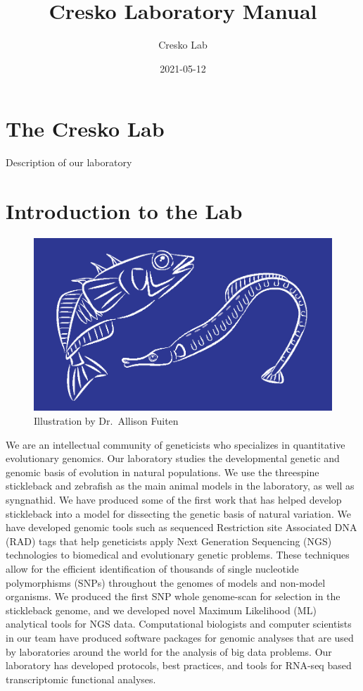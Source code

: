\documentclass[
]{book}
\title{Cresko Laboratory Manual}
\author{Cresko Lab}
\date{2021-05-12}
\begin{document}
\maketitle

{
\setcounter{tocdepth}{1}
\tableofcontents
}
\hypertarget{the-cresko-lab}{%
\chapter{The Cresko Lab}\label{the-cresko-lab}}

Description of our laboratory

\hypertarget{introduction-to-the-lab}{%
\chapter{Introduction to the Lab}\label{introduction-to-the-lab}}

\begin{figure}
\centering
\includegraphics{images/Lab_logo.png}
\caption{Illustration by Dr.~Allison Fuiten}
\end{figure}

We are an intellectual community of geneticists who specializes in quantitative evolutionary genomics. Our laboratory studies the developmental genetic and genomic basis of evolution in natural populations. We use the threespine stickleback and zebrafish as the main animal models in the laboratory, as well as syngnathid. We have produced some of the first work that has helped develop stickleback into a model for dissecting the genetic basis of natural variation. We have developed genomic tools such as sequenced Restriction site Associated DNA (RAD) tags that help geneticists apply Next Generation Sequencing (NGS) technologies to biomedical and evolutionary genetic problems. These techniques allow for the efficient identification of thousands of single nucleotide polymorphisms (SNPs) throughout the genomes of models and non-model organisms. We produced the first SNP whole genome-scan for selection in the stickleback genome, and we developed novel Maximum Likelihood (ML) analytical tools for NGS data. Computational biologists and computer scientists in our team have produced software packages for genomic analyses that are used by laboratories around the world for the analysis of big data problems. Our laboratory has developed protocols, best practices, and tools for RNA-seq based transcriptomic functional analyses.
\end{document}

